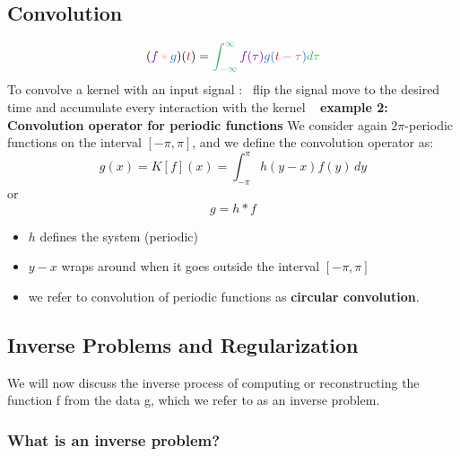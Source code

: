 \documentclass{article}
\newcommand{\plain}{\color{black}}
\newcommand{\growth}{\color{c1}}
\newcommand{\unitQuantity}{\color{c2}}
\newcommand{\unitInterest}{\color{c3}}
\newcommand{\unitTime}{\color{c4}}
\newcommand{\perfectly}{\color{c5}}
\newcommand{\compounded}{\color{c6}}
\begin{document}
\subsection{Convolution}
	$$
	\plain ( 
	\growth f
\perfectly *
\unitTime g
	\plain )
	\plain (
	\unitInterest t
	\plain )
\plain =
	\unitQuantity \int_{-\infty}^{\infty} \growth f(\tau)
	\unitTime g(\unitInterest t \compounded -\tau \unitTime) \unitQuantity d\tau $$
\perfectly To convolve
\growth       a kernel
\plain        with an 
\unitTime input signal :
\
\compounded flip the signal
\unitInterest move to the desired time 
\unitQuantity and accumulate every interaction  
\growth with the kernel ~\cite{colorized}
\plain 
\vspace{0.5cm}
\newline
\textbf{example 2: Convolution operator for periodic functions} 
\newline
We consider again $2\pi$-periodic functions on the interval $[-\pi, \pi]$, and we define the convolution operator as: 
$$ g(x)  =  K[f](x)  = \int_{-\pi}^{\pi} h(y - x )f(y) \, dy $$  or $$ g  =  h * f$$
\begin{itemize}
		\item $h$ defines the system (periodic) 
		\item $y-x$ wraps around when it goes outside the interval $[-\pi, \pi]$
		\item we refer to convolution of periodic functions as \textbf{circular convolution}.
	\end{itemize}

\subsection{Inverse Problems and Regularization}
We will now discuss the inverse process of computing or reconstructing the function f from the data g, which we refer to as an inverse problem.
\subsubsection{What is an inverse problem?}
\end{document}
